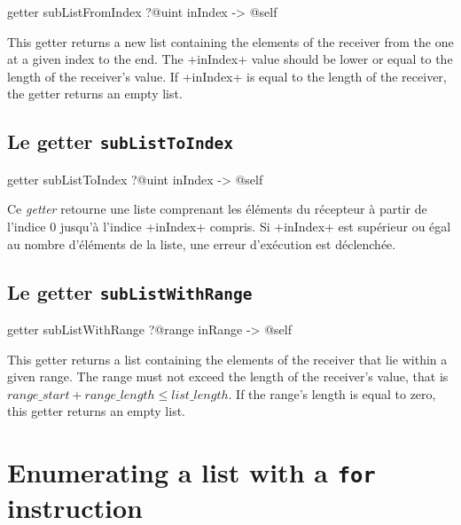 \begin{galgas}
getter subListFromIndex ?@uint inIndex -> @self
\end{galgas}

This getter returns a new list containing the elements of the receiver from the one at a given index to the end. The  \ggs+inIndex+ value should be lower or equal to the length of the receiver's value. If \ggs+inIndex+ is equal to the length of the receiver, the getter returns an empty list.






\subsection{Le getter \texttt{subListToIndex}}

\begin{galgas}
getter subListToIndex ?@uint inIndex -> @self
\end{galgas}

Ce \emph{getter} retourne une liste comprenant les éléments du récepteur à partir de l'indice $0$ jusqu'à l'indice \ggs+inIndex+ compris. Si \ggs+inIndex+ est supérieur ou égal au nombre d'éléments de la liste, une erreur d'exécution est déclenchée.




\subsection{Le getter \texttt{subListWithRange}}

\begin{galgas}
getter subListWithRange
  ?@range inRange
  -> @self
\end{galgas}

This getter returns a list containing the elements of the receiver that lie within a given range. The range must not exceed the length of the receiver's value, that is $range\_start + range\_length \leqslant list\_length$. If the range's length is equal to zero, this getter returns an empty list.















\section{Enumerating a list with a \texttt{for} instruction}

